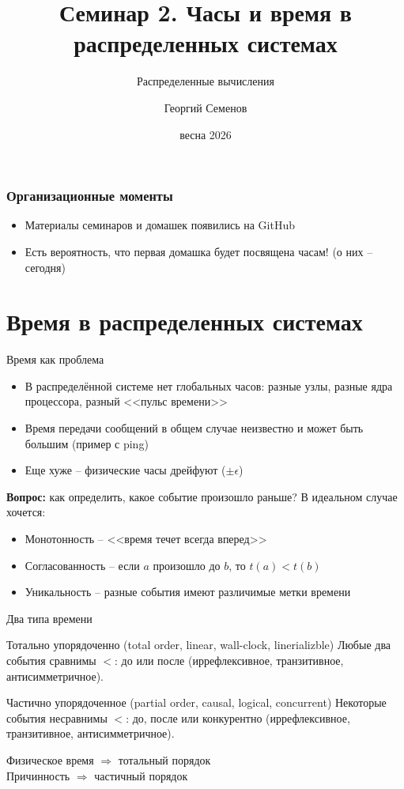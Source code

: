 \documentclass{beamer}
\title{Семинар 2. Часы и время в распределенных системах}
\subtitle{Распределенные вычисления}
\author{Георгий Семенов}
\institute{Институт прикладных компьютерных наук \\ Университет ИТМО}
\date{весна 2026}
\begin{document}
\frame{\titlepage}

\begin{frame}
\frametitle{Организационные моменты}

\begin{itemize}
  \item Материалы семинаров и домашек появились на GitHub
  \item Есть вероятность, что первая домашка будет посвящена часам! (о них – сегодня)
\end{itemize}

\end{frame}

\section{Время в распределенных системах}

\begin{frame}{Время как проблема}
\begin{itemize}
\item В распределённой системе нет глобальных часов: разные узлы, разные ядра процессора, разный <<пульс времени>>
\item Время передачи сообщений в общем случае неизвестно и может быть большим (пример с ping)
\item Еще хуже – физические часы дрейфуют ($\pm \epsilon$)
\end{itemize}

\textbf{Вопрос:} как определить, какое событие произошло раньше?
В идеальном случае хочется:

\begin{itemize}
\item Монотонность – <<время течет всегда вперед>>
\item Согласованность – если $a$ произошло до $b$, то $t(a) < t(b)$
\item Уникальность – разные события имеют различимые метки времени
\end{itemize}

\end{frame}


\begin{frame}{Два типа времени}
\begin{block}{Тотально упорядоченно (total order, linear, wall-clock, linerializble)}
Любые два события сравнимы $<$: до или после (иррефлексивное, транзитивное, антисимметричное).
\end{block}

\begin{block}{Частично упорядоченное (partial order, causal, logical, concurrent)}
Некоторые события несравнимы $<$: до, после или конкурентно (иррефлексивное, транзитивное, антисимметричное).
\end{block}

Физическое время $\Rightarrow$ тотальный порядок \\
Причинность $\Rightarrow$ частичный порядок

\end{frame}
\end{document}
